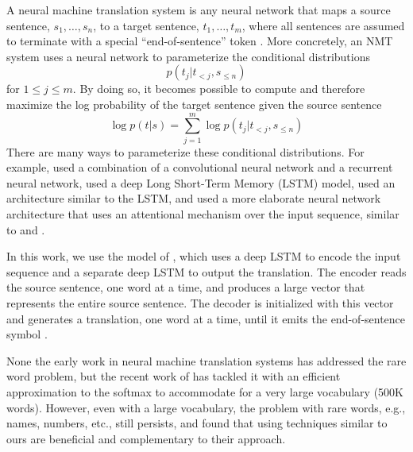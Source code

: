 
A neural machine translation system is any neural network that maps a source 
sentence, $s_1,\ldots,s_n$,
to a target sentence, $t_1,\ldots,t_m$, where all sentences are assumed to 
terminate with a special
``end-of-sentence'' token \eossym{}.  More concretely, an NMT system uses a neural 
network to parameterize the conditional distributions
\begin{equation}
p(t_j|t_{<j},s_{\leq n})
\end{equation}
for $1\leq j \leq m$.  By doing so, it becomes possible to 
compute and therefore maximize the log probability
of the target sentence given the source sentence
\begin{equation}
\log p(t|s) = \sum_{j=1}^m  \log p\left(t_j|t_{<j},s_{\leq n}\right)
\end{equation}
There are many ways to parameterize these conditional distributions.
For example,  used a combination of a
convolutional neural network and a recurrent neural network,  used a deep Long Short-Term Memory
(LSTM) model,  used an architecture similar to the LSTM, and
 used a more elaborate neural network
architecture that uses an attentional mechanism over the input sequence, 
similar to  and .  

In this work, we use the model of , which 
uses a deep LSTM to encode the input sequence and a separate deep LSTM 
to output the translation. The encoder reads the 
source sentence, one word at a time, and produces
a large vector that represents the entire source sentence. 
The decoder is initialized with this vector
and generates a translation, one word at a time, 
until it emits the end-of-sentence symbol \eossym{}.

None the early work in neural machine translation systems has addressed the rare word problem,
but the recent work of  has tackled it with 
an efficient approximation to the softmax to accommodate for a very large vocabulary (500K words). However, even with a large vocabulary, the problem with rare words, e.g., names, numbers, etc., still persists, and  found that using techniques similar to ours are beneficial and complementary to their approach.
